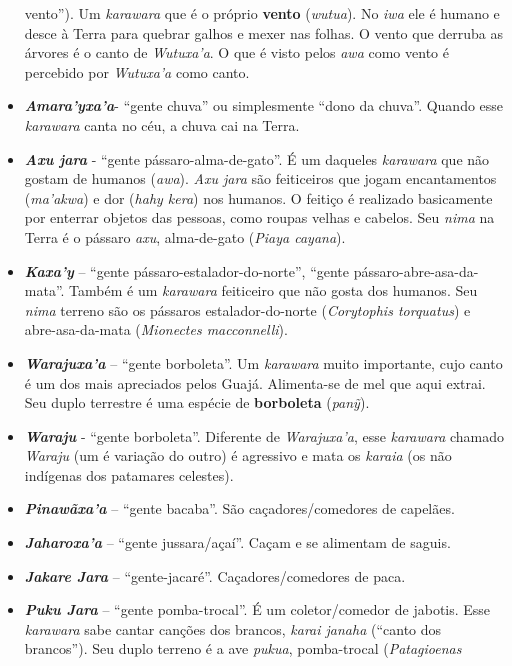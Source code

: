 \begin{itemize}
  vento''). Um \emph{karawara} que é o próprio \textbf{vento}
  (\emph{wutua}). No \emph{iwa} ele é humano e desce à Terra para
  quebrar galhos e mexer nas folhas. O vento que derruba as árvores é o
  canto de \emph{Wutuxa'a}. O que é visto pelos \emph{awa} como vento é
  percebido por \emph{Wutuxa'a} como canto.
\item
  \emph{\textbf{Amara'yxa'a}}- ``gente chuva'' ou simplesmente ``dono da
  chuva''. Quando esse \emph{karawara} canta no céu, a chuva cai na
  Terra.
\item
  \emph{\textbf{Axu jara}} - ``gente pássaro-alma-de-gato''. É um
  daqueles \emph{karawara} que não gostam de humanos (\emph{awa}).
  \emph{Axu jara} são feiticeiros que jogam encantamentos
  (\emph{ma'akwa}) e dor (\emph{hahy kera}) nos humanos. O feitiço é
  realizado basicamente por enterrar objetos das pessoas, como roupas
  velhas e cabelos. Seu \emph{nima} na Terra é o pássaro \emph{axu},
  alma-de-gato (\emph{Piaya cayana}).
\item
  \emph{\textbf{Kaxa'y}} -- ``gente pássaro-estalador-do-norte'',
  ``gente pássaro-abre-asa-da-mata''. Também é um \emph{karawara}
  feiticeiro que não gosta dos humanos. Seu \emph{nima} terreno são os
  pássaros estalador-do-norte (\emph{Corytophis torquatus}) e
  abre-asa-da-mata (\emph{Mionectes macconnelli}).
\item
  \emph{\textbf{Warajuxa'a}} -- ``gente borboleta''. Um \emph{karawara}
  muito importante, cujo canto é um dos mais apreciados pelos Guajá.
  Alimenta-se de mel que aqui extrai. Seu duplo terrestre é uma espécie
  de \textbf{borboleta} (\emph{panỹ}).
\item
  \emph{\textbf{Waraju}} - ``gente borboleta''. Diferente de
  \emph{Warajuxa'a}, esse \emph{karawara} chamado \emph{Waraju} (um é
  variação do outro) é agressivo e mata os \emph{karaia} (os não
  indígenas dos patamares celestes).
\item
  \emph{\textbf{Pinawãxa'a}} -- ``gente bacaba''. São
  caçadores/comedores de capelães.
\item
  \emph{\textbf{Jaharoxa'a}} -- ``gente jussara/açaí''. Caçam e se
  alimentam de saguis.
\item
  \emph{\textbf{Jakare Jara}} -- ``gente-jacaré''. Caçadores/comedores
  de paca.
\item
  \emph{\textbf{Puku Jara}} -- ``gente pomba-trocal''. É um
  coletor/comedor de jabotis. Esse \emph{karawara} sabe cantar canções
  dos brancos, \emph{karai janaha} (``canto dos brancos''). Seu duplo
  terreno é a ave \emph{pukua}, pomba-trocal (\emph{Patagioenas
}
\end{itemize}
